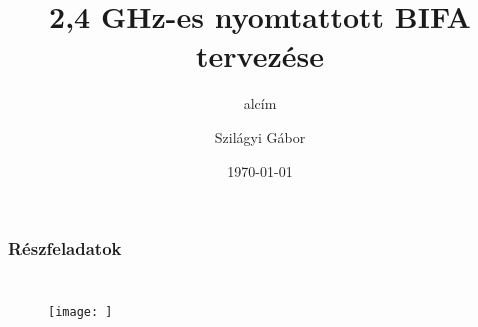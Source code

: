 \documentclass[aspectratio=169]{beamer}
\title{2,4 GHz-es nyomtattott BIFA tervezése}			%
\subtitle{alcím} 	%
\date{\today}
\author{Szilágyi Gábor}	%
\institute{} %
\begin{document}
\maketitle	%
\begin{frame}
	\frametitle{Részfeladatok}
	\begin{columns}	
			\begin{figure}
				\texttt{[image: ]}
			\end{figure}
	\end{columns}
\end{frame}
\end{document}

